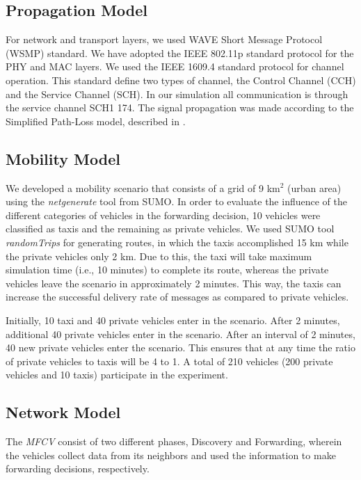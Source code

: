 \documentclass[letterpaper, 10 pt, conference]{ieeeconf}  %
\begin{document}
\subsection{Propagation Model}

For network and transport layers, we used WAVE Short Message Protocol (WSMP) standard. We have adopted the IEEE 802.11p standard protocol for the PHY and MAC layers. We used the IEEE 1609.4 standard protocol for channel operation. This standard define two types of channel, the Control Channel (CCH) and the Service Channel (SCH). In our simulation all communication is through the service channel SCH1 174. The signal propagation was made according to the Simplified Path-Loss model, described in \cite{tse2005}.

\subsection{Mobility Model}

We developed a mobility scenario that consists of a grid of 9 km$^2$ (urban area) using the \emph{netgenerate} tool from SUMO. In order to evaluate the influence of the different categories of vehicles in the forwarding decision, 10 vehicles were classified as taxis and the remaining as private vehicles. We used SUMO tool \emph{randomTrips} for generating routes, in which the taxis accomplished 15 km while the private vehicles only 2 km. Due to this, the taxi will take maximum simulation time (i.e., 10 minutes) to complete its route, whereas the private vehicles leave the scenario in approximately 2 minutes. This way, the taxis can increase the successful delivery rate of messages as compared to private vehicles.

Initially, 10 taxi and 40 private vehicles enter in the scenario. After 2 minutes, additional 40 private vehicles enter in the scenario. After an interval of 2 minutes, 40 new private vehicles enter the scenario. This ensures that at any time the ratio of private vehicles to taxis will be 4 to 1. A total of 210 vehicles (200 private vehicles and 10 taxis) participate in the experiment.

\subsection{Network Model}

The \emph{MFCV} consist of two different phases, Discovery and Forwarding, wherein the vehicles collect data from its neighbors and used the information to make forwarding decisions, respectively.
\end{document}
